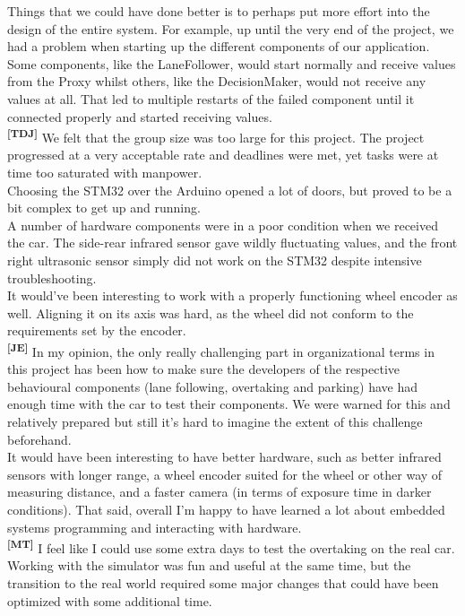 \noindent
Things that we could have done better is to perhaps put more effort into the
design of the entire system. For example, up until the very end of the project,
we had a problem when starting up the different components of our application.
Some components, like the LaneFollower, would start normally and receive values
from the Proxy whilst others, like the DecisionMaker, would not receive any
values at all. That led to multiple restarts of the failed component until it
connected properly and started receiving values.\\

\noindent
\textsuperscript{\textbf{[TDJ]}}
We felt that the group size was too large for this project. The project
progressed at a very acceptable rate and deadlines were met, yet tasks were at
time too saturated with manpower.\\
Choosing the STM32 over the Arduino opened a lot of doors, but proved to be a
bit complex to get up and running.\\
A number of hardware components were in a poor condition when we received the
car. The side-rear infrared sensor gave wildly fluctuating values, and the front
right ultrasonic sensor simply did not work on the STM32 despite intensive
troubleshooting.\\
It would’ve been interesting to work with a properly functioning wheel encoder
as well. Aligning it on its axis was hard, as the wheel did not conform to the
requirements set by the encoder.\\

\noindent
\textsuperscript{\textbf{[JE]}}
In my opinion, the only really challenging part in organizational terms in this
project has been how to make sure the developers of the respective behavioural
components (lane following, overtaking and parking) have had enough time with
the car to test their components. We were warned for this and relatively
prepared but still it's hard to imagine the extent of this challenge
beforehand.\\

\noindent
It would have been interesting to have better hardware, such as better infrared
sensors with longer range, a wheel encoder suited for the wheel or other way of
measuring distance, and a faster camera (in terms of exposure time in darker
conditions). That said, overall I'm happy to have learned a lot about embedded
systems programming and interacting with hardware.\\

\noindent
\textsuperscript{\textbf{[MT]}}
I feel like I could use some extra days to test the overtaking on the real car.
Working with the simulator was fun and useful at the same time, but the
transition to the real world required some major changes that could have been
optimized with some additional time.\\

